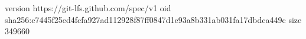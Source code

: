 version https://git-lfs.github.com/spec/v1
oid sha256:c7445f25ed4fcfa927ad112928f87ff0847d1e93a8b331ab031fa17dbdca449c
size 349660

